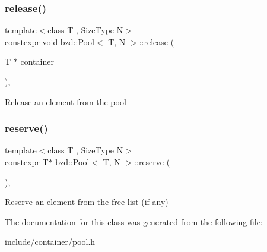 \subsubsection{\texorpdfstring{release()}{release()}}
{\footnotesize\ttfamily template$<$class T , Size\+Type N$>$ \\
constexpr void \hyperlink{classbzd_1_1Pool}{bzd\+::\+Pool}$<$ T, N $>$\+::release (\begin{DoxyParamCaption}\item[{T $\ast$}]{container }\end{DoxyParamCaption})\hspace{0.3cm}{\ttfamily [inline]}, {\ttfamily [noexcept]}}

Release an element from the pool \mbox{\label{classbzd_1_1Pool_a7f29ee139282eda6d22e5b81beb185fb}} 
\subsubsection{\texorpdfstring{reserve()}{reserve()}}
{\footnotesize\ttfamily template$<$class T , Size\+Type N$>$ \\
constexpr T$\ast$ \hyperlink{classbzd_1_1Pool}{bzd\+::\+Pool}$<$ T, N $>$\+::reserve (\begin{DoxyParamCaption}{ }\end{DoxyParamCaption})\hspace{0.3cm}{\ttfamily [inline]}, {\ttfamily [noexcept]}}

Reserve an element from the free list (if any) 

The documentation for this class was generated from the following file\+:\begin{DoxyCompactItemize}
\item 
include/container/pool.\+h\end{DoxyCompactItemize}
